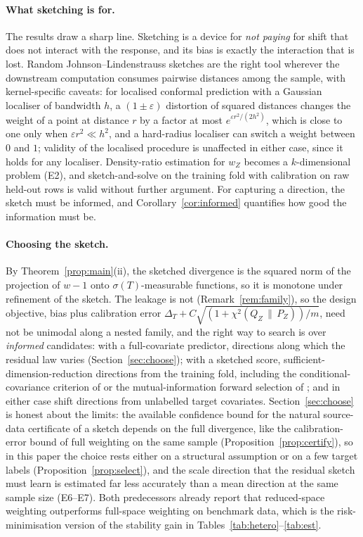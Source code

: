 \documentclass[11pt,a4paper]{article}
\newcommand{\chisqZ}{\chi^2(Q_Z\,\|\,P_Z)}
\theoremstyle{plain}
\theoremstyle{definition}
\theoremstyle{remark}
\begin{document}
\paragraph{What sketching is for.}
The results draw a sharp line. Sketching is a device for \emph{not paying} for shift that does not interact with the response, and its bias is exactly the interaction that is lost. Random Johnson--Lindenstrauss sketches are the right tool wherever the downstream computation consumes pairwise distances among the sample, with kernel-specific caveats: for localised conformal prediction \cite{guan2023} with a Gaussian localiser of bandwidth $h$, a $(1\pm\varepsilon)$ distortion of squared distances changes the weight of a point at distance $r$ by a factor at most $e^{\varepsilon r^2/(2h^2)}$, which is close to one only when $\varepsilon r^2\ll h^2$, and a hard-radius localiser can switch a weight between $0$ and $1$; validity of the localised procedure is unaffected in either case, since it holds for any localiser. Density-ratio estimation for $w_Z$ becomes a $k$-dimensional problem (E2), and sketch-and-solve on the training fold \cite{raskutti2016} with calibration on raw held-out rows is valid without further argument. For capturing a direction, the sketch must be informed, and Corollary~\ref{cor:informed} quantifies how good the information must be.

\paragraph{Choosing the sketch.}
By Theorem~\ref{prop:main}(ii), the sketched divergence is the squared norm of the projection of $w-1$ onto $\sigma(T)$-measurable functions, so it is monotone under refinement of the sketch. The leakage is not (Remark~\ref{rem:family}), so the design objective, bias plus calibration error $\Delta_T+C\sqrt{(1+\chisqZ)/m}$, need not be unimodal along a nested family, and the right way to search is over \emph{informed} candidates: with a full-covariate predictor, directions along which the residual law varies (Section~\ref{sec:choose}); with a sketched score, sufficient-dimension-reduction directions \cite{li1991,cook1998} from the training fold, including the conditional-covariance criterion of \cite{stojanov2019} or the mutual-information forward selection of \cite{polo2022}; and in either case shift directions from unlabelled target covariates. Section~\ref{sec:choose} is honest about the limits: the available confidence bound for the natural source-data certificate of a sketch depends on the full divergence, like the calibration-error bound of full weighting on the same sample (Proposition~\ref{prop:certify}), so in this paper the choice rests either on a structural assumption or on a few target labels (Proposition~\ref{prop:select}), and the scale direction that the residual sketch must learn is estimated far less accurately than a mean direction at the same sample size (E6--E7). Both predecessors already report that reduced-space weighting outperforms full-space weighting on benchmark data, which is the risk-minimisation version of the stability gain in Tables~\ref{tab:hetero}--\ref{tab:est}.
\end{document}
